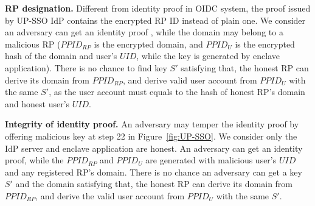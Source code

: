 

\vspace{1mm}\noindent\textbf{RP designation.} 
Different from identity proof in OIDC system, the proof issued by UP-SSO IdP contains the encrypted RP ID instead of plain one. 
We consider an adversary can get an identity proof
, while the domain may belong to a malicious RP ($PPID_{RP}$ is the encrypted domain, and $PPID_U$ is the encrypted hash of the domain and user's $UID$, while the key is generated by enclave application).
There is no chance to find key $S'$ satisfying that, the honest RP can derive its domain from $PPID_{RP}$, and derive valid user account from $PPID_U$ with the same $S'$, as the user account must equals to the hash of honest RP's domain and honest user's $UID$.


\vspace{1mm}\noindent\textbf{Integrity of identity proof.}
An adversary may temper the identity proof by offering malicious key at step 22 in Figure~\ref{fig:UP-SSO}. 
We consider  only the IdP server and enclave application are honest. 
An adversary can get an identity proof, 
while the $PPID_{RP}$ and $PPID_U$ are generated with malicious user's $UID$ and any registered RP's domain.
There is no chance an adversary can get a key $S'$ and the domain satisfying that, 
the honest RP can derive its domain from $PPID_{RP}$, and derive the valid user account from $PPID_U$ with the same $S'$. 


